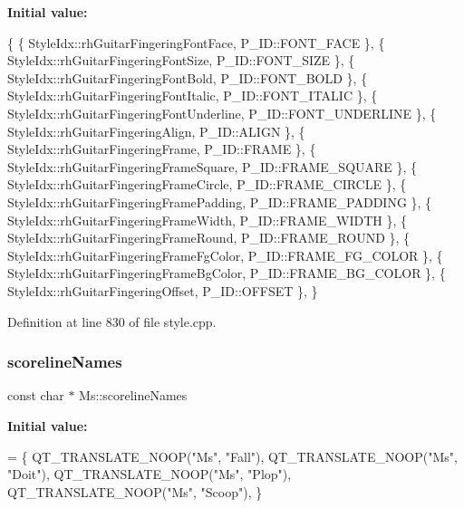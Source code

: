 {\bfseries Initial value\+:}
\begin{DoxyCode}
\{
      \{ StyleIdx::rhGuitarFingeringFontFace,          P\_ID::FONT\_FACE              \},
      \{ StyleIdx::rhGuitarFingeringFontSize,          P\_ID::FONT\_SIZE              \},
      \{ StyleIdx::rhGuitarFingeringFontBold,          P\_ID::FONT\_BOLD              \},
      \{ StyleIdx::rhGuitarFingeringFontItalic,        P\_ID::FONT\_ITALIC            \},
      \{ StyleIdx::rhGuitarFingeringFontUnderline,     P\_ID::FONT\_UNDERLINE         \},
      \{ StyleIdx::rhGuitarFingeringAlign,             P\_ID::ALIGN                  \},
      \{ StyleIdx::rhGuitarFingeringFrame,             P\_ID::FRAME                  \},
      \{ StyleIdx::rhGuitarFingeringFrameSquare,       P\_ID::FRAME\_SQUARE           \},
      \{ StyleIdx::rhGuitarFingeringFrameCircle,       P\_ID::FRAME\_CIRCLE           \},
      \{ StyleIdx::rhGuitarFingeringFramePadding,      P\_ID::FRAME\_PADDING          \},
      \{ StyleIdx::rhGuitarFingeringFrameWidth,        P\_ID::FRAME\_WIDTH            \},
      \{ StyleIdx::rhGuitarFingeringFrameRound,        P\_ID::FRAME\_ROUND            \},
      \{ StyleIdx::rhGuitarFingeringFrameFgColor,      P\_ID::FRAME\_FG\_COLOR         \},
      \{ StyleIdx::rhGuitarFingeringFrameBgColor,      P\_ID::FRAME\_BG\_COLOR         \},
      \{ StyleIdx::rhGuitarFingeringOffset,            P\_ID::OFFSET                 \},
      \}
\end{DoxyCode}


Definition at line 830 of file style.\+cpp.

\mbox{\label{namespace_ms_a591e3201b83ac58a69157a5351ce038d}} 
\subsubsection{\texorpdfstring{scoreline\+Names}{scorelineNames}}
{\footnotesize\ttfamily const char $\ast$ Ms\+::scoreline\+Names}

{\bfseries Initial value\+:}
\begin{DoxyCode}
= \{
      QT\_TRANSLATE\_NOOP(\textcolor{stringliteral}{"Ms"}, \textcolor{stringliteral}{"Fall"}),
      QT\_TRANSLATE\_NOOP(\textcolor{stringliteral}{"Ms"}, \textcolor{stringliteral}{"Doit"}),
      QT\_TRANSLATE\_NOOP(\textcolor{stringliteral}{"Ms"}, \textcolor{stringliteral}{"Plop"}),
      QT\_TRANSLATE\_NOOP(\textcolor{stringliteral}{"Ms"}, \textcolor{stringliteral}{"Scoop"}),
      \}
\end{DoxyCode}


